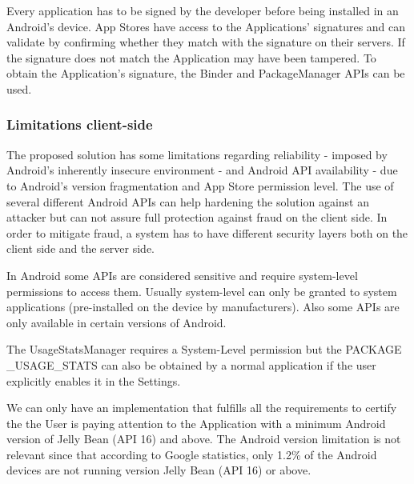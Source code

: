 Every application has to be signed by the developer before being installed in an Android's device. App Stores have access to the Applications' signatures and can validate by confirming whether they match with the signature on their servers. If the signature does not match the Application may have been tampered. To obtain the Application's signature, the Binder and PackageManager APIs can be used.

\subsubsection{Limitations client-side}

The proposed solution has some limitations regarding reliability - imposed by Android's inherently insecure environment - and Android API availability - due to Android's version fragmentation and App Store permission level. The use of several different Android APIs can help hardening the solution against an attacker but can not assure full protection against fraud on the client side. In order to mitigate fraud, a system has to have different security layers both on the client side and the server side. 

In Android some APIs are considered sensitive and require system-level permissions to access them. Usually system-level can only be granted to system applications (pre-installed on the device by manufacturers). Also some APIs are only available in certain versions of Android. %



The UsageStatsManager requires a System-Level permission but the PACKAGE \_USAGE\_STATS can also be obtained by a normal application if the user explicitly enables it in the Settings.

We can only have an implementation that fulfills all the requirements to certify the the User is paying attention to the Application with a minimum Android version of Jelly Bean (API 16) and above. The Android version limitation is not relevant since that according to Google statistics, only 1.2\% of the Android devices are not running version Jelly Bean (API 16) or above. %

